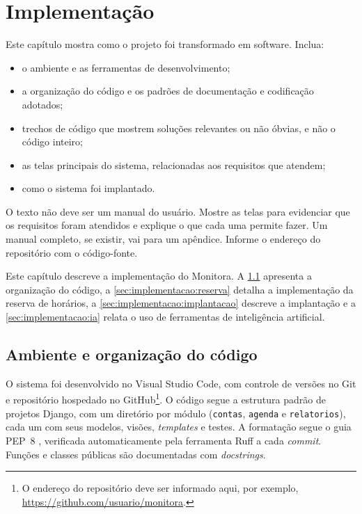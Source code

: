 \chapter{Implementação}
\label{cap:implementacao}

\begin{instrucao}
Este capítulo mostra como o projeto foi transformado em software. Inclua:
\begin{itemize}
  \item o ambiente e as ferramentas de desenvolvimento;
  \item a organização do código e os padrões de documentação e codificação
        adotados;
  \item trechos de código que mostrem soluções relevantes ou não óbvias, e
        não o código inteiro;
  \item as telas principais do sistema, relacionadas aos requisitos que
        atendem;
  \item como o sistema foi implantado.
\end{itemize}
O texto não deve ser um manual do usuário. Mostre as telas para evidenciar que
os requisitos foram atendidos e explique o que cada uma permite fazer. Um
manual completo, se existir, vai para um apêndice. Informe o endereço do
repositório com o código-fonte.
\end{instrucao}

Este capítulo descreve a implementação do Monitora. A
\cref{sec:implementacao:organizacao} apresenta a organização do código, a
\cref{sec:implementacao:reserva} detalha a implementação da reserva de
horários, a \cref{sec:implementacao:implantacao} descreve a implantação e a
\cref{sec:implementacao:ia} relata o uso de ferramentas de inteligência
artificial.

\section{Ambiente e organização do código}
\label{sec:implementacao:organizacao}

O sistema foi desenvolvido no Visual Studio Code, com controle de versões no
Git e repositório hospedado no GitHub\footnote{O endereço do repositório deve
ser informado aqui, por exemplo, \url{https://github.com/usuario/monitora}.}.
O código segue a estrutura padrão de projetos Django, com um diretório por
módulo (\texttt{contas}, \texttt{agenda} e \texttt{relatorios}), cada um com
seus modelos, visões, \emph{templates} e testes. A formatação segue o guia
PEP~8 \cite{vanrossum2001pep8}, verificada automaticamente pela ferramenta
Ruff a cada \emph{commit}. Funções e classes públicas são documentadas com
\emph{docstrings}.

